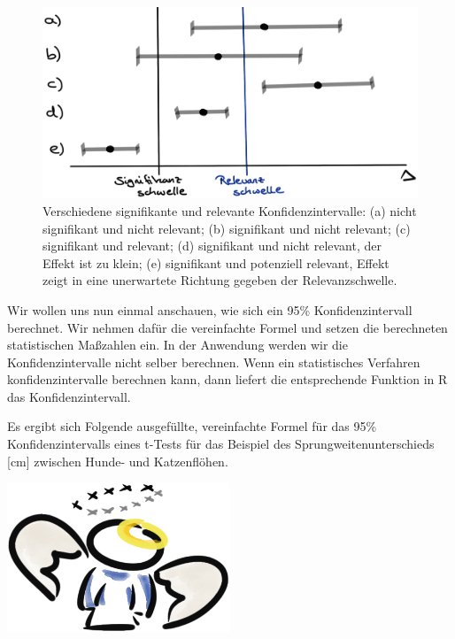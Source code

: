 \documentclass[
  letterpaper,
  DIV=11,
  oneside]{scrreport}
\begin{document}
\begin{figure}

{\centering \includegraphics{./images/ci-02.png}

}

\caption{\label{fig-relevanz}Verschiedene signifikante und relevante
Konfidenzintervalle: (a) nicht signifikant und nicht relevant; (b)
signifikant und nicht relevant; (c) signifikant und relevant; (d)
signifikant und nicht relevant, der Effekt ist zu klein; (e) signifikant
und potenziell relevant, Effekt zeigt in eine unerwartete Richtung
gegeben der Relevanzschwelle.}

\end{figure}

Wir wollen uns nun einmal anschauen, wie sich ein 95\%
Konfidenzintervall berechnet. Wir nehmen dafür die vereinfachte Formel
und setzen die berechneten statistischen Maßzahlen ein. In der Anwendung
werden wir die Konfidenzintervalle nicht selber berechnen. Wenn ein
statistisches Verfahren konfidenzintervalle berechnen kann, dann liefert
die entsprechende Funktion in R das Konfidenzintervall.

Es ergibt sich Folgende ausgefüllte, vereinfachte Formel für das 95\%
Konfidenzintervalls eines t-Tests für das Beispiel des
Sprungweitenunterschieds {[}cm{]} zwischen Hunde- und Katzenflöhen.

\begin{marginfigure}

{\centering \includegraphics[width=0.5\textwidth,height=\textheight]{./images/angel_01.png}

}

\end{marginfigure}
\end{document}
